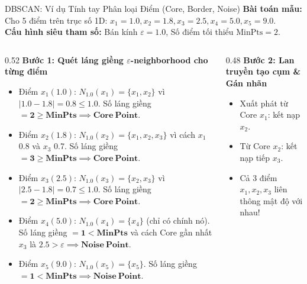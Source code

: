 \documentclass[aspectratio=169,10pt]{beamer}
\begin{document}
\begin{frame}{DBSCAN: Ví dụ Tính tay Phân loại Điểm (Core, Border, Noise)}
  \scriptsize
  \textbf{Bài toán mẫu:} Cho 5 điểm trên trục số 1D: $x_1=1.0, x_2=1.8, x_3=2.5, x_4=5.0, x_5=9.0$.\\
  \textbf{Cấu hình siêu tham số:} Bán kính $\varepsilon = 1.0$, Số điểm tối thiểu $\text{MinPts} = 2$.
  
  \vspace{0.4em}
  \begin{columns}[T]
    \begin{column}{0.52\textwidth}
      \textbf{Bước 1: Quét láng giềng $\varepsilon$-neighborhood cho từng điểm}
      \begin{itemize}\setlength{\itemsep}{1.5pt}
        \item Điểm $x_1(1.0)$: $N_{1.0}(x_1) = \{x_1, x_2\}$ vì $|1.0-1.8| = 0.8 \le 1.0$.
          Số láng giềng $= \mathbf{2 \ge \text{MinPts}} \implies \mathbf{Core\ Point}$.
        \item Điểm $x_2(1.8)$: $N_{1.0}(x_2) = \{x_1, x_2, x_3\}$ vì cách $x_1$ 0.8 và $x_3$ 0.7.
          Số láng giềng $= \mathbf{3 \ge \text{MinPts}} \implies \mathbf{Core\ Point}$.
        \item Điểm $x_3(2.5)$: $N_{1.0}(x_3) = \{x_2, x_3\}$ vì $|2.5-1.8| = 0.7 \le 1.0$.
          Số láng giềng $= \mathbf{2 \ge \text{MinPts}} \implies \mathbf{Core\ Point}$.
        \item Điểm $x_4(5.0)$: $N_{1.0}(x_4) = \{x_4\}$ (chỉ có chính nó).
          Số láng giềng $= \mathbf{1 < \text{MinPts}}$ và cách Core gần nhất $x_3$ là $2.5 > \varepsilon \implies \mathbf{Noise\ Point}$.
        \item Điểm $x_5(9.0)$: $N_{1.0}(x_5) = \{x_5\}$.
          Số láng giềng $= \mathbf{1 < \text{MinPts}} \implies \mathbf{Noise\ Point}$.
      \end{itemize}
    \end{column}
    \begin{column}{0.48\textwidth}
      \textbf{Bước 2: Lan truyền tạo cụm \& Gán nhãn}
      \begin{itemize}\setlength{\itemsep}{2pt}
        \item Xuất phát từ Core $x_1$: kết nạp $x_2$.
        \item Từ Core $x_2$: kết nạp tiếp $x_3$.
        \item Cả 3 điểm $x_1, x_2, x_3$ liên thông mật độ với nhau!
      \end{itemize}
      \vspace{0.2em}

\end{column}
\end{columns}
\end{frame}
\end{document}
